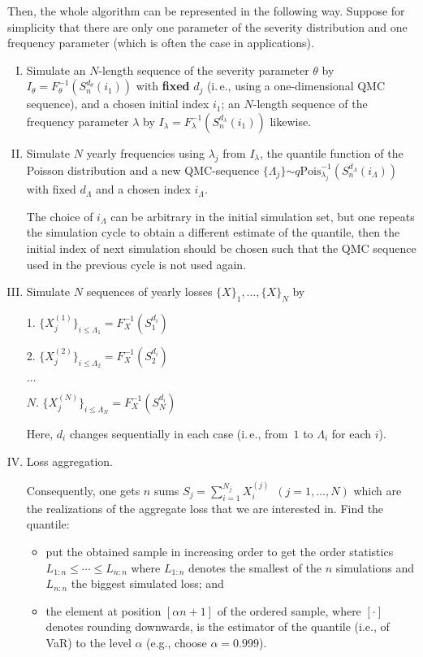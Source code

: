 \begin{multicols}{2}
Then, the whole algorithm can be represented in the following way.
Suppose for simplicity that there are only one parameter of the
severity distribution and one frequency parameter (which is often
the case in applications).
\begin{enumerate}[I.]
\item Simulate an $N$-length sequence of the severity parameter
$\theta$ by
$I_\theta=F_{\theta}^{-1}\left(S^{d_{\theta}}_n(i_1)\right)$ with
{\bf fixed} $d_j$ (i.\,e., using a one-dimensional QMC sequence), and
a chosen initial index $i_1$; an $N$-length sequence of the
frequency parameter $\lambda$ by
$I_\lambda=F_{\lambda}^{-1}\left(S^{d_{\lambda}}_n(i_1)\right)$
likewise.
\item Simulate $N$ yearly frequencies using $\lambda_j$ from $I_\lambda$,
the quantile function of the Poisson distribution and a new
QMC-sequence $\{\Lambda_j\}$\linebreak $\sim
q\mathrm{Pois}_{\lambda_j}^{-1}\left(S^{d_{\Lambda}}_n(i_\Lambda)\right)$
with fixed $d_{\Lambda}$ and a chosen index $i_\Lambda$. \par

The choice of $i_\Lambda$ can be arbitrary in the initial simulation
set, but one repeats the simulation cycle to obtain a different
estimate of the quantile, then the initial index of next simulation
should be chosen such that the QMC sequence used in the previous
cycle is not used again.
\item Simulate $N$ sequences of yearly losses $\{X\}_1,\dots,\{X\}_N$ by
\par 1.
$\{X^{(1)}_j\}_{i\leq \Lambda_1} =
F_{X}^{-1}\left(S^{d_{i}}_1\right)$\par 2. $\{X^{(2)}_j\}_{i\leq
\Lambda_2} = F_{X}^{-1}\left(S^{d_{i}}_2\right)$
\par $\dots$\par
$N$. $\{X^{(N)}_j\}_{i\leq \Lambda_N} =
F_{X}^{-1}\left(S^{d_{i}}_N\right)$\par

Here, $d_i$ changes sequentially in each case (i.\,e., from~$1$ to
$\Lambda_i$ for each $i$).
\item Loss aggregation.

Consequently,
one gets $n$ sums $S_j = \sum\limits_{i=1}^{N_{j}}X^{(j)}_i$\,
$(j=1,\dots,N)$ which are the realizations of the aggregate loss
that we are interested in. Find the quantile:
\begin{itemize}
\item
put the obtained sample in increasing order to get the order
statistics $L_{1:n}
 \le \cdots \le L_{n:n}$ where $L_{1:n}$ denotes the smallest of the $n$
 simulations and $L_{n:n}$ the biggest simulated loss; and
\item
the element at position $[\alpha n+1]$ of the ordered sample,
where $[\cdot]$ denotes rounding downwards, is the estimator of
the quantile (i.e., of VaR) to the level $\alpha$ (e.g., choose {\bf
$\alpha=0.999$}).
\end{itemize}
\end{enumerate}


\end{multicols}
